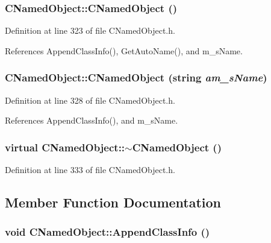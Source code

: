 \subsubsection{\setlength{\rightskip}{0pt plus 5cm}CNamed\-Object::CNamed\-Object ()\hspace{0.3cm}{\tt  [inline]}}\label{classCNamedObject_a0}




Definition at line 323 of file CNamed\-Object.h.

References Append\-Class\-Info(), Get\-Auto\-Name(), and m\_\-s\-Name.
\subsubsection{\setlength{\rightskip}{0pt plus 5cm}CNamed\-Object::CNamed\-Object (string {\em am\_\-s\-Name})\hspace{0.3cm}{\tt  [inline]}}\label{classCNamedObject_a1}




Definition at line 328 of file CNamed\-Object.h.

References Append\-Class\-Info(), and m\_\-s\-Name.
\subsubsection{\setlength{\rightskip}{0pt plus 5cm}virtual CNamed\-Object::$\sim$CNamed\-Object ()\hspace{0.3cm}{\tt  [inline, virtual]}}\label{classCNamedObject_a2}




Definition at line 333 of file CNamed\-Object.h.

\subsection{Member Function Documentation}
\subsubsection{\setlength{\rightskip}{0pt plus 5cm}void CNamed\-Object::Append\-Class\-Info ()\hspace{0.3cm}{\tt  [protected, virtual]}}\label{classCNamedObject_b2}


